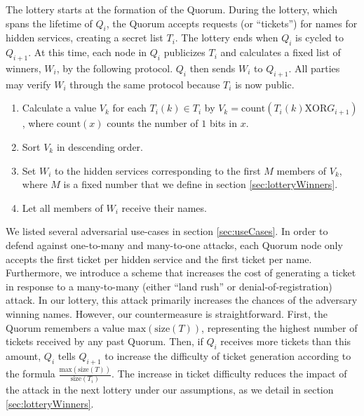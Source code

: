 \documentclass[USenglish,oneside,twocolumn]{article}
\begin{document}
The lottery starts at the formation of the Quorum. During the lottery, which spans the lifetime of $ Q_{i} $, the Quorum accepts requests (or ``tickets'') for names for hidden services, creating a secret list $ T_{i} $. The lottery ends when $ Q_{i} $ is cycled to $ Q_{i + 1} $. At this time, each node in $ Q_{i} $ publicizes $ T_{i} $ and calculates a fixed list of winners, $ W_{i} $, by the following protocol. $ Q_{i} $ then sends $ W_{i} $ to $ Q_{i + 1} $. All parties may verify $ W_{i} $ through the same protocol because $ T_{i} $ is now public.

\begin{enumerate} %
	\item Calculate a value $ V_{k} $ for each $ T_{i}(k) \in T_{i} $ by $ V_{k} = \mathrm{count}(T_{i}(k) \mathrm{XOR} G_{i + 1}) $, where $ \mathrm{count}(x) $ counts the number of $ 1 $ bits in $ x $.
	\item Sort $ V_{k} $ in descending order.
	\item Set $ W_{i} $ to the hidden services corresponding to the first $ M $ members of $ V_{k} $, where $ M $ is a fixed number that we define in section \ref{sec:lotteryWinners}.
	\item Let all members of $ W_{i} $ receive their names.
\end{enumerate}

We listed several adversarial use-cases in section \ref{sec:useCases}. In order to defend against one-to-many and many-to-one attacks, each Quorum node only accepts the first ticket per hidden service and the first ticket per name. Furthermore, we introduce a scheme that increases the cost of generating a ticket in response to a many-to-many (either ``land rush'' or denial-of-registration) attack. In our lottery, this attack primarily increases the chances of the adversary winning names. However, our countermeasure is straightforward. First, the Quorum remembers a value $ \mathrm{max}(\mathrm{size}(T)) $, representing the highest number of tickets received by any past Quorum. Then, if $ Q_{i} $ receives more tickets than this amount, $ Q_{i} $ tells $ Q_{i + 1} $ to increase the difficulty of ticket generation according to the formula $ \frac{\mathrm{max}(\mathrm{size}(T))}{\mathrm{size}(T_{i})} $. The increase in ticket difficulty reduces the impact of the attack in the next lottery under our assumptions, as we detail in section \ref{sec:lotteryWinners}.

%
%
\end{document}
